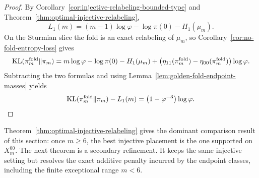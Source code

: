 \begin{proof}
By Corollary~\ref{cor:injective-relabeling-bounded-type} and
Theorem~\ref{thm:optimal-injective-relabeling},
\[
L_1(m)
=
(m-1)\log\varphi-\log\pi(0)-H_1(\mu_m).
\]
On the Sturmian slice the fold is an exact relabeling of \(\mu_m\), so
Corollary~\ref{cor:no-fold-entropy-loss} gives
\[
\operatorname{KL}(\pi_m^{\mathrm{fold}}\|\pi_m)
=
m\log\varphi-\log\pi(0)-H_1(\mu_m)
+
\bigl(\eta_{11}(\pi_m^{\mathrm{fold}})
-\eta_{00}(\pi_m^{\mathrm{fold}})\bigr)\log\varphi .
\]
Subtracting the two formulas and using
Lemma~\ref{lem:golden-fold-endpoint-masses} yields
\[
\operatorname{KL}(\pi_m^{\mathrm{fold}}\|\pi_m)-L_1(m)
=
\bigl(1-\varphi^{-3}\bigr)\log\varphi.
\]
\end{proof}

Theorem~\ref{thm:optimal-injective-relabeling} gives the dominant comparison
result of this section: once \(m\ge6\), the best injective placement is the
one supported on \(X_m^{00}\).  The next theorem is a secondary refinement. It
keeps the same injective setting but resolves the exact additive penalty
incurred by the endpoint classes, including the finite exceptional range
\(m<6\).

